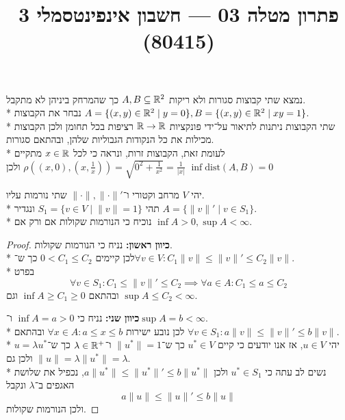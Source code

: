 
\title{פתרון מטלה 03 --- חשבון אינפינטסמלי 3 (80415)}


\maketitle
\maketitleprint{}

\Question{}
נמצא שתי קבוצות סגורות ולא ריקות $A, B \subseteq \mathbb{R}^2$ כך שהמרחק ביניהן לא מתקבל. \\*
נבחר את הקבוצות $A = \{ (x, y) \in \mathbb{R}^2 \mid y = 0\}, B = \{ (x, y) \in \mathbb{R}^2 \mid x y = 1 \}$. \\*
שתי הקבוצות ניתנות לתיאור על־ידי פונקציות $\mathbb{R} \to \mathbb{R}$ רציפות בכל תחומן ולכן הקבוצות מכילות את כל הנקודות הגבוליות שלהן, ובהתאם סגורות. \\*
לעומת זאת, הקבוצות זרות, ונראה כי לכל $x \in \mathbb{R}$ מתקיים $\rho((x, 0), (x, \frac{1}{x})) = \sqrt{0^2 + \frac{1}{x^2}} = \frac{1}{|x|}$ ולכן $\inf \text{dist}(A, B) = 0$

\Question{}
יהי $V$ מרחב וקטורי ו־$\lVert \cdot \rVert, \lVert \cdot \rVert'$ שתי נורמות עליו. \\*
תהי $S_1 = \{ v \in V \mid \lVert v \rVert = 1 \}$ ונגדיר $A = \{ \lVert v\rVert' \mid v \in S_1\}$. \\*
נוכיח כי הנורמות שקולות אם ורק אם $\inf A > 0, \sup A < \infty$.
\begin{proof}
	\textbf{כיוון ראשון:}
	נניח כי הנורמות שקולות. \\*
	לכן קיימים $0 < C_1 \le C_2$ כך ש־$\forall v \in V : C_1 \lVert v \rVert \le \lVert v \rVert' \le C_2 \lVert v \rVert$. \\*
	בפרט
	\[
		\forall v \in S_1 : C_1 \le \lVert v \rVert' \le C_2
		\implies \forall a \in A : C_1 \le a \le C_2
	\]
	ובהתאם $\inf A \ge C_1 \ge 0$ וגם $\sup A \le C_2 < \infty$.

	\textbf{כיוון שני:}
	נניח כי $\inf A = a > 0$ ו־$\sup A = b < \infty$. \\*
	לכן נובע ישירות $\forall x \in A : a \le x \le b$ ובהתאם $\forall v \in S_1 : a \lVert v \rVert \le \lVert v \rVert' \le b \lVert v \rVert$. \\*
	יהי $u \in V$, אז אנו יודעים כי קיים $u^* \in V$ כך ש־$\lVert u^* \rVert = 1$ ו־$\lambda \in \mathbb{R}^+$ כך ש־$u = \lambda u^*$ ולכן גם $\lVert u \rVert = \lambda \lVert u^* \rVert = \lambda$. \\*
	נשים לב עתה כי $u^* \in S_1$ ולכן $a \lVert u^* \rVert \le \lVert u^* \rVert' \le b \lVert u^* \rVert$, נכפיל את שלושת האגפים ב־$\lambda$ ונקבל
	\[
		a \lVert u \rVert \le \lVert u \rVert' \le b \lVert u \rVert
	\]
	ולכן הנורמות שקולות.
\end{proof}

